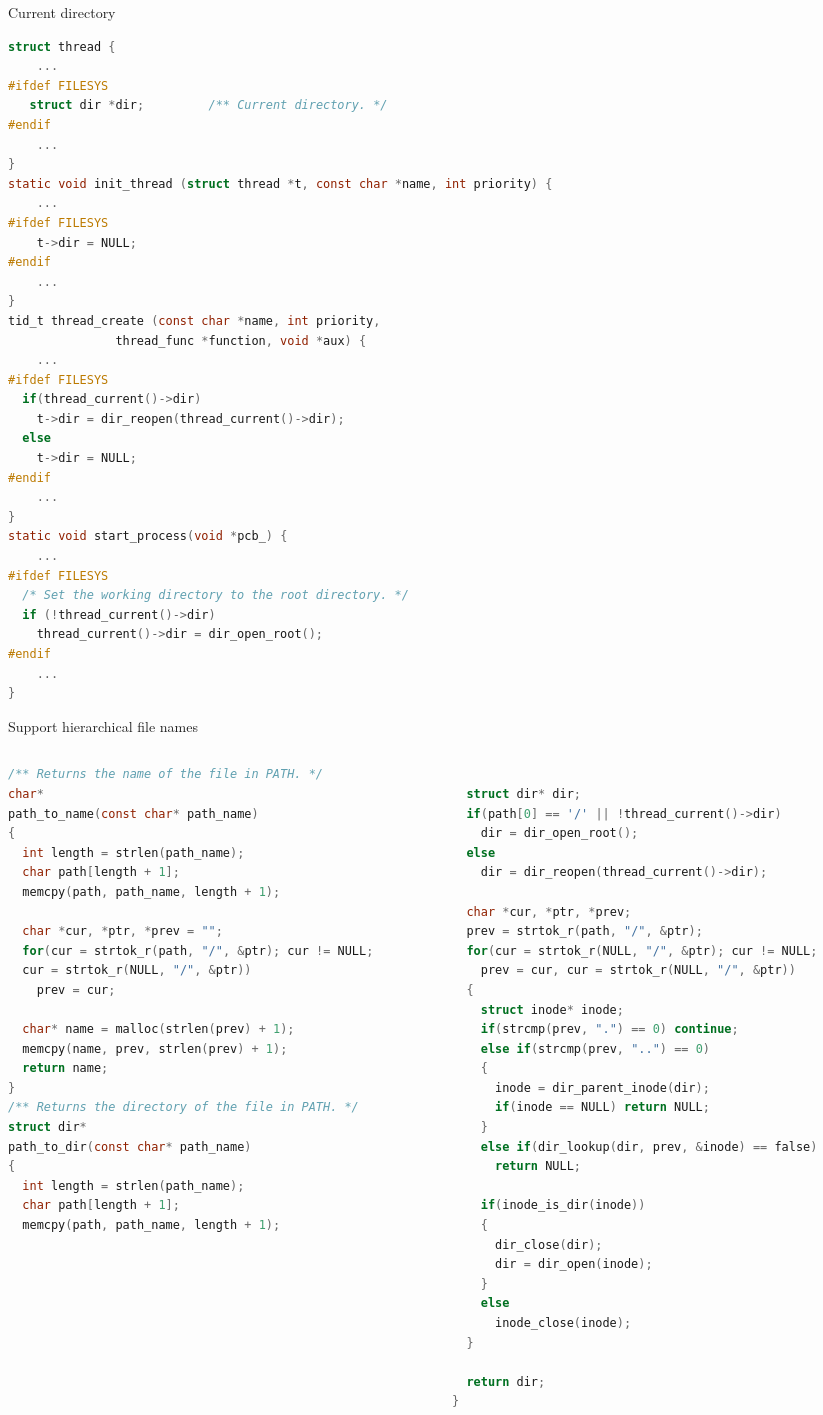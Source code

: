 \documentclass[10pt]{beamer}
\begin{document}
\begin{frame}[fragile]{Current directory}
\begin{lstlisting}[language=C]
struct thread {
    ...
#ifdef FILESYS
   struct dir *dir;         /** Current directory. */
#endif
    ...
}
static void init_thread (struct thread *t, const char *name, int priority) {
    ...
#ifdef FILESYS
    t->dir = NULL;
#endif
    ...
}
tid_t thread_create (const char *name, int priority,
               thread_func *function, void *aux) {
    ...
#ifdef FILESYS  
  if(thread_current()->dir) 
    t->dir = dir_reopen(thread_current()->dir);
  else
    t->dir = NULL;
#endif
    ...
}
static void start_process(void *pcb_) {
    ...
#ifdef FILESYS
  /* Set the working directory to the root directory. */
  if (!thread_current()->dir)
    thread_current()->dir = dir_open_root();
#endif
    ...
}
\end{lstlisting}
\end{frame}
\begin{frame}[fragile]{Support hierarchical file names}
\begin{columns}
\begin{column}{0.5\textwidth}
\begin{lstlisting}[language=C]
/** Returns the name of the file in PATH. */
char*
path_to_name(const char* path_name)
{
  int length = strlen(path_name);  
  char path[length + 1];
  memcpy(path, path_name, length + 1);

  char *cur, *ptr, *prev = "";
  for(cur = strtok_r(path, "/", &ptr); cur != NULL; 
  cur = strtok_r(NULL, "/", &ptr))
    prev = cur;

  char* name = malloc(strlen(prev) + 1);
  memcpy(name, prev, strlen(prev) + 1);
  return name;
}
/** Returns the directory of the file in PATH. */
struct dir*
path_to_dir(const char* path_name)
{
  int length = strlen(path_name);
  char path[length + 1];
  memcpy(path, path_name, length + 1);
\end{lstlisting}
\end{column}
\begin{column}{0.5\textwidth}
\begin{lstlisting}[language=C]

  struct dir* dir;
  if(path[0] == '/' || !thread_current()->dir)
    dir = dir_open_root();
  else
    dir = dir_reopen(thread_current()->dir);
  
  char *cur, *ptr, *prev;
  prev = strtok_r(path, "/", &ptr);
  for(cur = strtok_r(NULL, "/", &ptr); cur != NULL;
    prev = cur, cur = strtok_r(NULL, "/", &ptr))
  {
    struct inode* inode;
    if(strcmp(prev, ".") == 0) continue;
    else if(strcmp(prev, "..") == 0)
    {
      inode = dir_parent_inode(dir);
      if(inode == NULL) return NULL;
    }
    else if(dir_lookup(dir, prev, &inode) == false)
      return NULL;

    if(inode_is_dir(inode))
    {
      dir_close(dir);
      dir = dir_open(inode);
    }
    else
      inode_close(inode);
  }

  return dir;
}
\end{lstlisting}
\end{column}
\end{columns}
\end{frame}
\end{document}
